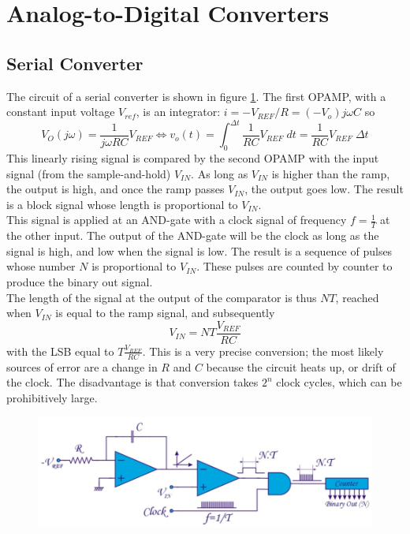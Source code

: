 \section{Analog-to-Digital Converters}
\subsection{Serial Converter}
\label{sec:serial_adc}
The circuit of a  serial converter is shown in figure \ref{fig:adc1}. The first OPAMP, with a constant input voltage $V_{ref}$, is an integrator: $i = -V_{REF} / R  = (-V_o) j \omega C$ so $$V_O(j\omega)  = \frac{1}{j \omega RC} V_{REF} \Leftrightarrow v_o(t)= \int_{0}^{\Delta t} \frac{1}{RC} V_{REF} \; dt = \frac{1}{RC} V_{REF} \; \Delta t$$
This linearly rising signal is compared by the second OPAMP with the input signal (from the sample-and-hold) $V_{IN}$. As long as $V_{IN}$ is higher than the ramp, the output is high, and once the ramp passes $V_{IN}$, the output goes low. The result is a block signal whose length is proportional to $V_{IN}$. \\
This signal is applied at an AND-gate with a clock signal of frequency $f = \frac{1}{T}$ at the other input. The output of the AND-gate will be the clock as long as the signal is high, and low when the signal is low.  The result is a sequence of pulses whose number $N$ is proportional to $V_{IN}$. These pulses are counted by counter to produce the binary out signal.\\
The length of the signal at the output of the comparator is thus $N T$, reached when $V_{IN}$ is equal to the ramp signal, and subsequently
$$
V_{IN} = N T \frac{V_{REF}}{RC}
$$
with the LSB equal to $T \frac{V_{REF}}{RC}$. This is a very precise conversion; the most likely sources of error are a change in $R$ and $C$ because the circuit heats up, or drift of the clock. The disadvantage is that conversion takes $2^n$ clock cycles, which can be prohibitively large.
\begin{figure}[h!]
	\centering
	\includegraphics[width=14cm]{figures/ch18/adc1.jpg}
	\caption{}
	\label{fig:adc1}
\end{figure}

